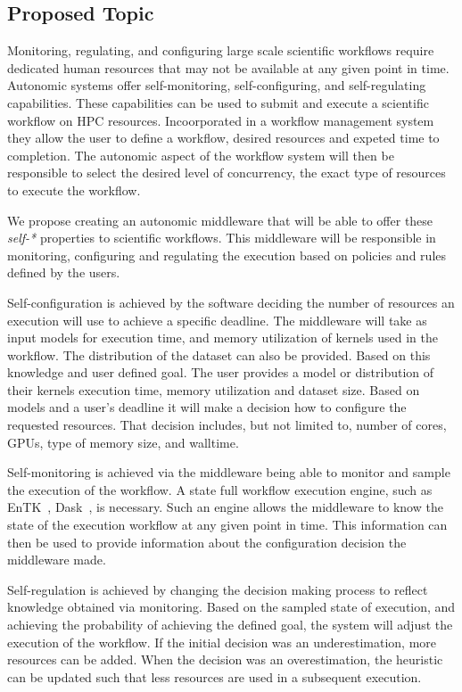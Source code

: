 \subsection{Proposed Topic}

Monitoring, regulating, and configuring large scale scientific workflows require 
dedicated human resources that may not be available at any given point in time. 
Autonomic systems offer self-monitoring, self-configuring, and self-regulating 
capabilities.  These capabilities can be used to submit and execute a scientific 
workflow on HPC resources. Incoorporated in a workflow management system they 
allow the user to define a workflow, desired resources and expeted time to 
completion. The autonomic aspect of the workflow system will then be responsible 
to select the desired level of concurrency, the exact type of resources to execute
the workflow.

We propose creating an autonomic middleware that will be able to offer these 
\textit{self-*} properties to scientific workflows. This middleware will be 
responsible in monitoring, configuring and regulating the execution based on 
policies and rules defined by the users. 

Self-configuration is achieved by the software deciding the number of resources 
an execution will use to achieve a specific deadline. The middleware will take as 
input models for execution time, and memory utilization of kernels used in the 
workflow. The distribution of the dataset can also be provided. Based on this 
knowledge and user defined goal. The user provides a model or distribution of 
their kernels execution time, memory utilization and dataset size. Based on models 
and a user's deadline it will make a decision how to configure the requested 
resources. That decision includes, but not limited to, number of cores, GPUs, 
type of memory size, and walltime.

Self-monitoring is achieved via the middleware being able to monitor and sample 
the execution of the workflow. A state full workflow execution engine, such as 
EnTK~\cite{balasubramanian2018harnessing}, Dask~\cite{rocklin2015dask}, is 
necessary. Such an engine allows the middleware to know the state of the execution 
workflow at any given point in time. This information can then be used to provide 
information about the configuration decision the middleware made.

Self-regulation is achieved by changing the decision making process to reflect 
knowledge obtained via monitoring. Based on the sampled state of execution, and 
achieving the probability of achieving the defined goal, the system will adjust 
the execution of the workflow. If the initial decision was an underestimation, 
more resources can be added. When the decision was an overestimation, the heuristic 
can be updated such that less resources are used in a subsequent execution.

